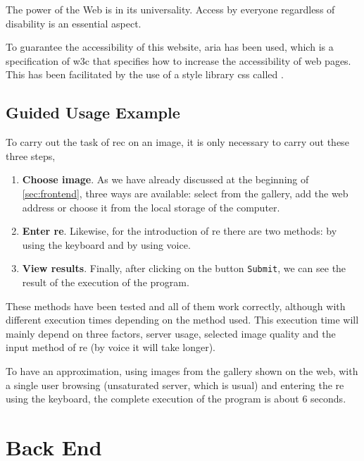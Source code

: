 \begin{quoteBox}
  The power of the Web is in its universality. Access by everyone regardless of
  disability is an essential aspect. \tcblower
\end{quoteBox}

To guarantee the accessibility of this website, \gls{aria} has been used, which
is a specification of \gls{w3c} that specifies how to increase the
accessibility of web pages. This has been facilitated by the use of a style
library \gls{css} called .


\subsection{Guided Usage Example}

To carry out the task of \gls{rec} on an image, it is only necessary to carry
out these three steps,
\begin{enumerate}
  \item \textbf{Choose image}. As we have already discussed at the beginning of
  \vref{sec:frontend}, three ways are available: select from the gallery, add
  the web address or choose it from the local storage of the computer.
  \item \textbf{Enter \gls*{re}}. Likewise, for the introduction of \gls{re}
  there are two methods: by using the keyboard and by using voice.
  \item \textbf{View results}. Finally, after clicking on the button
  \texttt{Submit}, we can see the result of the execution of the program.
\end{enumerate}

These methods have been tested and all of them work correctly, although with
different execution times depending on the method used. This execution time
will mainly depend on three factors, server usage, selected image quality and
the input method of \gls{re} (by voice it will take longer).

\begin{exampleBox}
  To have an approximation, using images from the gallery shown on the web,
  with a single user browsing (unsaturated server, which is usual) and entering
  the \gls{re} using the keyboard, the complete execution of the program is
  about 6 seconds.
\end{exampleBox}



\section{Back End}\label{sec:backend}

